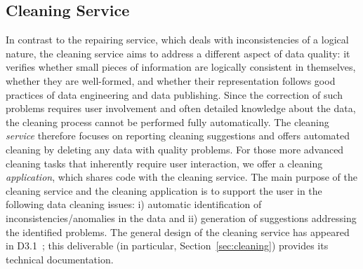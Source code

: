 \subsection{Cleaning Service}

In contrast to the repairing service, which deals with inconsistencies of a logical nature, the cleaning service aims to address a different aspect of data quality: it verifies whether 
small pieces of information are logically consistent in themselves, whether they are well-formed, and whether their representation follows good practices of data engineering and data publishing.
Since the correction of such problems requires user involvement and often detailed knowledge about the data, the cleaning process cannot be performed fully automatically.
The cleaning \emph{service} therefore focuses on reporting cleaning suggestions and offers automated cleaning by deleting any data with quality problems.
For those more advanced cleaning tasks that inherently require user interaction, we offer a cleaning \emph{application}, which shares code with the cleaning service.
The main purpose of the cleaning service and the cleaning application is to support the user in the following data cleaning issues: i) automatic identification of inconsistencies/anomalies in the data and
ii) generation of suggestions addressing the identified problems.
The general design of the cleaning service has appeared in D3.1~\cite{d3.1}; this deliverable (in particular, Section~\ref{sec:cleaning}) provides its technical documentation.

